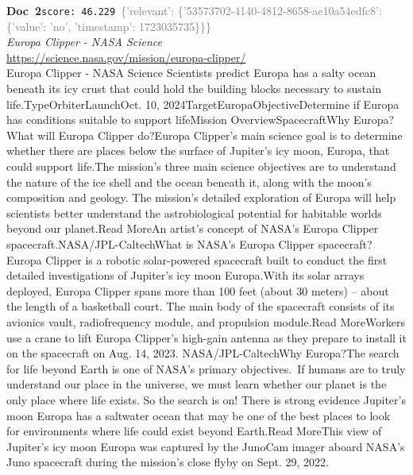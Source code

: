 \documentclass[a4paper,11pt]{article}
\begin{document}
\begin{docenv}
{\footnotesize\textcolor{doccolor}{\textbf{Doc~2}}}\hfill{\tiny\texttt{score:~46.229}}\ {\tiny\textcolor{gray}{\{'relevant': \{'53573702-4140-4812-8658-ae10a54edfc8': \{'value': 'no', 'timestamp': 1723035735\}\}\}}}\\[3pt]
{\small\textit{Europa Clipper - NASA Science}}\\[2pt]
{\tiny\url{https://science.nasa.gov/mission/europa-clipper/}}\\[4pt]
{\footnotesize Europa Clipper - NASA Science
Scientists predict Europa has a salty ocean beneath its icy crust that could hold the building blocks necessary to sustain life.TypeOrbiterLaunchOct. 10, 2024TargetEuropaObjectiveDetermine if Europa has conditions suitable to support lifeMission OverviewSpacecraftWhy Europa?What will Europa Clipper do?Europa Clipper’s main science goal is to determine whether there are places below the surface of Jupiter’s icy moon, Europa, that could support life.The mission’s three main science objectives are to understand the nature of the ice shell and the ocean beneath it, along with the moon’s composition and geology. The mission’s detailed exploration of Europa will help scientists better understand the astrobiological potential for habitable worlds beyond our planet.Read MoreAn artist's concept of NASA’s Europa Clipper spacecraft.NASA/JPL-CaltechWhat is NASA’s Europa Clipper spacecraft?Europa Clipper is a robotic solar-powered spacecraft built to conduct the first detailed investigations of Jupiter's icy moon Europa.With its solar arrays deployed, Europa Clipper spans more than 100 feet (about 30 meters) – about the length of a basketball court. The main body of the spacecraft consists of its avionics vault, radiofrequency module, and propulsion module.Read MoreWorkers use a crane to lift Europa Clipper's high-gain antenna as they prepare to install it on the spacecraft on Aug. 14, 2023. NASA/JPL-CaltechWhy Europa?The search for life beyond Earth is one of NASA’s primary objectives. If humans are to truly understand our place in the universe, we must learn whether our planet is the only place where life exists. So the search is on! There is strong evidence Jupiter's moon Europa has a saltwater ocean that may be one of the best places to look for environments where life could exist beyond Earth.Read MoreThis view of Jupiter’s icy moon Europa was captured by the JunoCam imager aboard NASA’s Juno spacecraft during the mission’s close flyby on Sept. 29, 2022.}
\end{docenv}
\end{document}
